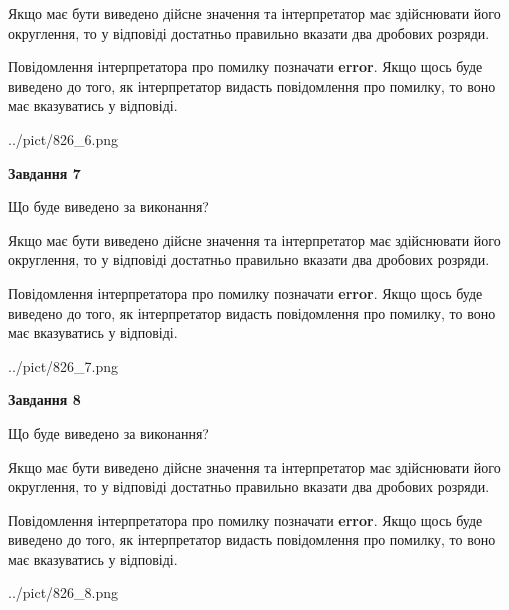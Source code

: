 \documentclass[12pt, ukrainian]{article}
\begin{document}
{\begin {Large}
Якщо має бути виведено дійсне значення та інтерпретатор має здійснювати його округлення, 
то у відповіді достатньо правильно вказати два дробових розряди.

Повідомлення інтерпретатора про помилку позначати \textbf{error}.
Якщо щось буде виведено до того, як інтерпретатор видасть повідомлення про помилку, 
то воно має вказуватись у відповіді. \par

\begin{center}
	{../pict/826_6.png}
\end{center}
\newpage

{\begin {center}\textbf{Завдання 7}\end {center}}\par
Що буде виведено за виконання? \par

Якщо має бути виведено дійсне значення та інтерпретатор має здійснювати його округлення, 
то у відповіді достатньо правильно вказати два дробових розряди.

Повідомлення інтерпретатора про помилку позначати \textbf{error}.
Якщо щось буде виведено до того, як інтерпретатор видасть повідомлення про помилку, 
то воно має вказуватись у відповіді. \par

\begin{center}
	{../pict/826_7.png}
\end{center}
\newpage

{\begin {center}\textbf{Завдання 8}\end {center}}\par
Що буде виведено за виконання? \par

Якщо має бути виведено дійсне значення та інтерпретатор має здійснювати його округлення, 
то у відповіді достатньо правильно вказати два дробових розряди.

Повідомлення інтерпретатора про помилку позначати \textbf{error}.
Якщо щось буде виведено до того, як інтерпретатор видасть повідомлення про помилку, 
то воно має вказуватись у відповіді. \par

\begin{center}
	{../pict/826_8.png}
\end{center}
\newpage


\end{Large}}
\end{document}
